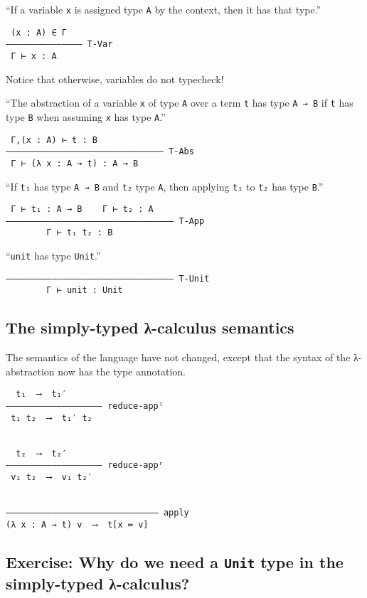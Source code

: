 \documentclass[11pt]{article}
\theoremstyle{definition}
\begin{document}
“If a variable \texttt{x} is assigned type \texttt{A} by the context,
then it has that type.”
\begin{verbatim}
 (x : A) ∈ Γ
––––––––––––––– T-Var
 Γ ⊢ x : A
\end{verbatim}
Notice that otherwise, variables do not typecheck!

“The abstraction of a variable \texttt{x} of type \texttt{A} over a term \texttt{t} has
type \texttt{A → B} if \texttt{t} has type \texttt{B} when assuming \texttt{x} has type \texttt{A}.” 
\begin{verbatim}
 Γ,(x : A) ⊢ t : B
––––––––––––––––––––––––––––––– T-Abs
 Γ ⊢ (λ x : A → t) : A → B
\end{verbatim}

“If \texttt{t₁} has type \texttt{A → B} and \texttt{t₂} type \texttt{A}, then applying \texttt{t₁} to \texttt{t₂} has type \texttt{B}.”
\begin{verbatim}
 Γ ⊢ t₁ : A → B    Γ ⊢ t₂ : A
––––––––––––––––––––––––––––––––– T-App
        Γ ⊢ t₁ t₂ : B
\end{verbatim}

“\texttt{unit} has type \texttt{Unit}.” 
\begin{verbatim}
––––––––––––––––––––––––––––––––– T-Unit
        Γ ⊢ unit : Unit
\end{verbatim}

\subsection{The simply-typed λ-calculus semantics}
\label{sec:org30b2459}

The semantics of the language have not changed,
except that the syntax of the λ-abstraction now
has the type annotation.
\begin{verbatim}
  t₁  ⟶  t₁′
––––––––––––––––––– reduce-appˡ
 t₁ t₂  ⟶  t₁′ t₂

 
  t₂  ⟶  t₂′
––––––––––––––––––– reduce-appʳ
 v₁ t₂  ⟶  v₁ t₂′


–––––––––––––––––––––––––––––– apply
(λ x : A → t) v  ⟶  t[x ≔ v]
\end{verbatim}

\subsection{Exercise: Why do we need a \texttt{Unit} type in the simply-typed λ-calculus?}
\label{sec:orgd186d24}
\end{document}
